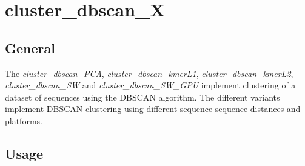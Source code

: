 \section{cluster\_dbscan\_X} \label{sec-dbscan-cluster}

\subsection{General}

The \emph{cluster\_dbscan\_PCA}, \emph{cluster\_dbscan\_kmerL1},
\emph{cluster\_dbscan\_kmerL2}, \emph{cluster\_dbscan\_SW} and
\emph{cluster\_dbscan\_SW\_GPU} implement clustering of a dataset of
sequences using the DBSCAN \cite{dbscan} algorithm. The different
variants implement DBSCAN clustering using different sequence-sequence
distances and platforms. 

\subsection{Usage}

